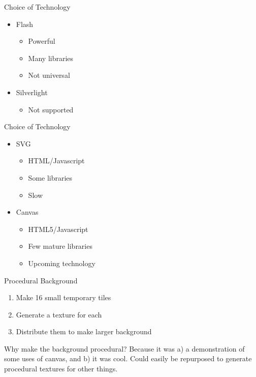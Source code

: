 \begin{frame}{Choice of Technology}
  \begin{itemize}
    \item Flash
      \begin{itemize}
        \item Powerful
        \item Many libraries
        \item Not universal
      \end{itemize}
    \item Silverlight
      \begin{itemize}
        \item Not supported
      \end{itemize}
  \end{itemize}
\end{frame}

\begin{frame}{Choice of Technology}
  \begin{itemize}
    \item SVG
      \begin{itemize}
        \item HTML/Javascript
        \item Some libraries
        \item Slow
      \end{itemize}
    \item Canvas
      \begin{itemize}
        \item HTML5/Javascript
        \item Few mature libraries
        \item Upcoming technology
      \end{itemize}
  \end{itemize}
\end{frame}

\begin{frame}{Procedural Background}
  \begin{enumerate}
    \item Make 16 small temporary tiles
    \item Generate a texture for each
    \item Distribute them to make larger background
  \end{enumerate}
\end{frame}
\begin{flushleft}
  Why make the background procedural? Because it was a) a demonstration of some uses of canvas, and b) it was cool.
  Could easily be repurposed to generate procedural textures for other things.
\end{flushleft}


